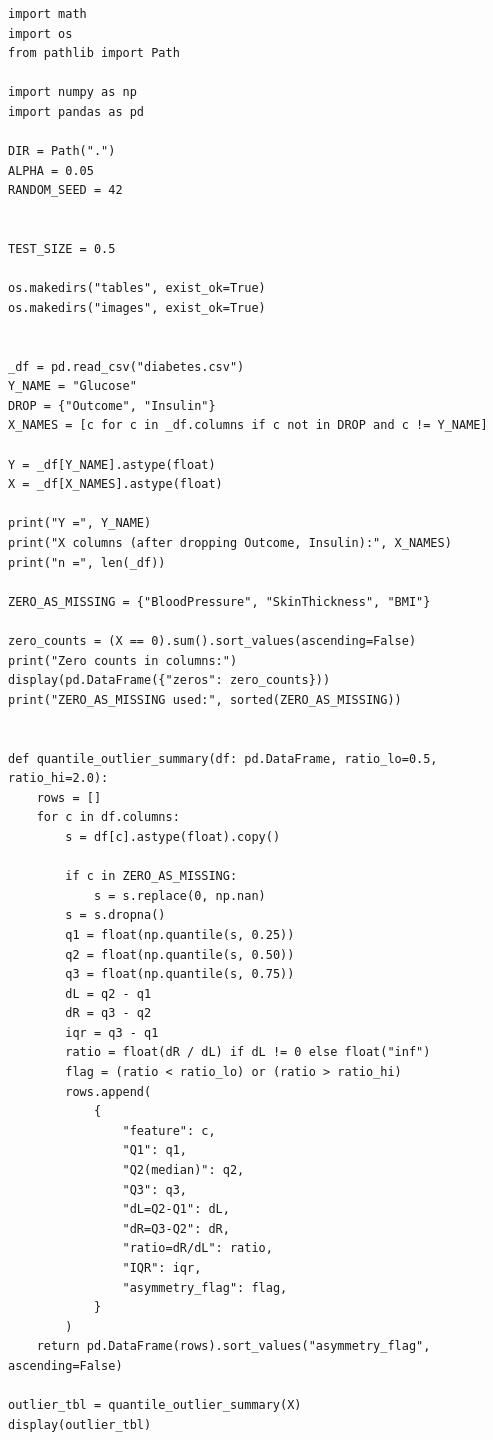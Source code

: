 \documentclass[a4paper, 14pt]{extarticle}
\begin{document}
\newenvironment{longlisting}{\captionsetup{type=listing}}{}
\begin{longlisting}
\caption{Модель линейной регрессии}
\begin{verbatim}
import math
import os
from pathlib import Path

import numpy as np
import pandas as pd

DIR = Path(".")
ALPHA = 0.05
RANDOM_SEED = 42


TEST_SIZE = 0.5

os.makedirs("tables", exist_ok=True)
os.makedirs("images", exist_ok=True)


_df = pd.read_csv("diabetes.csv")
Y_NAME = "Glucose"
DROP = {"Outcome", "Insulin"}
X_NAMES = [c for c in _df.columns if c not in DROP and c != Y_NAME]

Y = _df[Y_NAME].astype(float)
X = _df[X_NAMES].astype(float)

print("Y =", Y_NAME)
print("X columns (after dropping Outcome, Insulin):", X_NAMES)
print("n =", len(_df))

ZERO_AS_MISSING = {"BloodPressure", "SkinThickness", "BMI"}

zero_counts = (X == 0).sum().sort_values(ascending=False)
print("Zero counts in columns:")
display(pd.DataFrame({"zeros": zero_counts}))
print("ZERO_AS_MISSING used:", sorted(ZERO_AS_MISSING))


def quantile_outlier_summary(df: pd.DataFrame, ratio_lo=0.5, ratio_hi=2.0):
    rows = []
    for c in df.columns:
        s = df[c].astype(float).copy()
        
        if c in ZERO_AS_MISSING:
            s = s.replace(0, np.nan)
        s = s.dropna()
        q1 = float(np.quantile(s, 0.25))
        q2 = float(np.quantile(s, 0.50))
        q3 = float(np.quantile(s, 0.75))
        dL = q2 - q1
        dR = q3 - q2
        iqr = q3 - q1
        ratio = float(dR / dL) if dL != 0 else float("inf")
        flag = (ratio < ratio_lo) or (ratio > ratio_hi)
        rows.append(
            {
                "feature": c,
                "Q1": q1,
                "Q2(median)": q2,
                "Q3": q3,
                "dL=Q2-Q1": dL,
                "dR=Q3-Q2": dR,
                "ratio=dR/dL": ratio,
                "IQR": iqr,
                "asymmetry_flag": flag,
            }
        )
    return pd.DataFrame(rows).sort_values("asymmetry_flag", ascending=False)

outlier_tbl = quantile_outlier_summary(X)
display(outlier_tbl)


\end{verbatim}
\end{longlisting}
\end{document}
